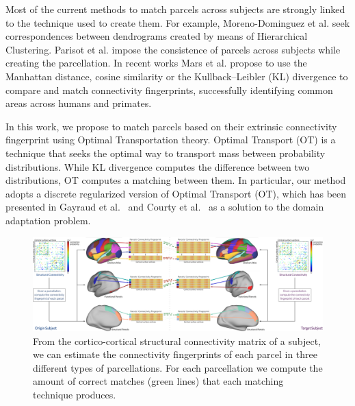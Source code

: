 Most of the current methods to match parcels across subjects are strongly linked to the technique used to create them. For example, Moreno-Dominguez et al. \cite{Moreno-Dominguez2014} seek correspondences between dendrograms created by means of Hierarchical Clustering. Parisot et al. \cite{Paristot2015} impose the consistence of parcels across subjects while creating the parcellation. In recent works Mars et al. propose to use the Manhattan distance, cosine similarity \cite{Mars2016} or the Kullback–Leibler (KL) divergence \cite{Mars2018} to compare and match connectivity fingerprints, successfully identifying common areas across humans and primates.

In this work, we propose to match parcels based on their extrinsic connectivity fingerprint using Optimal Transportation theory. Optimal Transport (OT) is a technique that seeks the optimal way to transport mass between probability distributions. While KL divergence computes the difference between two distributions, OT computes a matching between them. In particular, our method adopts a discrete regularized version of Optimal Transport (OT), which has been presented in Gayraud et al.~\cite{nathalie} and Courty et al.~\cite{remi} as a solution to the domain adaptation problem.

\begin{figure}[t!]
\centering
\includegraphics[width=1\textwidth]{3.matching/images/method}
\caption{From the cortico-cortical structural connectivity matrix of a subject, we can estimate the connectivity fingerprints of each parcel in three different types of parcellations. For each parcellation we compute the amount of correct matches (green lines) that each matching technique produces.}
\label{fig:method}
\end{figure}

